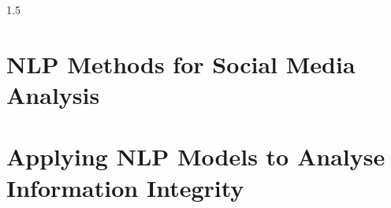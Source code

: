 \documentclass[12pt,twoside]{report}
\begin{document}
\begin{flushleft}
\begin{spacing}{1.5}




\part{NLP Methods for Social Media Analysis}





\part{Applying NLP Models to Analyse Information Integrity}







\end{spacing}
\end{flushleft}


% 







\fi
\end{document}
